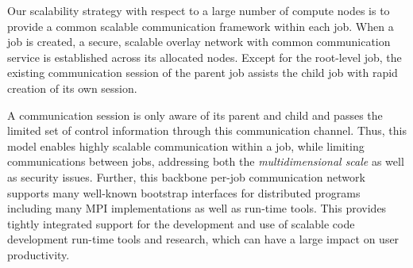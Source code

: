 \vspace{1ex}
Our scalability strategy with respect to a large number 
of compute nodes is to provide a common scalable communication 
framework within each job. When a job is created, a secure, scalable 
overlay network with common communication service is established 
across its allocated nodes. Except for the root-level job, 
the existing communication session of the parent job assists 
the child job with rapid creation of its own session. 

A communication session is only aware of its parent 
and child and passes the limited set of control information 
through this communication channel. Thus, this model 
enables highly scalable communication within a job, while 
limiting communications between jobs, addressing 
both the {\em multidimensional scale} as well as security issues.
Further, this backbone per-job communication network 
supports many well-known bootstrap interfaces 
for distributed programs including many MPI implementations 
as well as run-time tools.  This provides tightly integrated support
for the development and use of scalable code development run-time tools
and research, which can have a large impact on user productivity.
